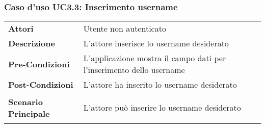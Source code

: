 \subsubsection{Caso d'uso UC3.3: Inserimento username}
\label{UC3_3}

\begin{longtable}{ l | p{11cm}}
	\hline
	\rowcolor{Gray}
	 \multicolumn{2}{c}{UC3.3: Inserimento username} \\
	 \hline
	\textbf{Attori} & Utente non autenticato \\
	\textbf{Descrizione} & L'attore inserisce lo username desiderato \\
	\textbf{Pre-Condizioni} & L'applicazione mostra il campo dati per l'inserimento dello username \\
	\textbf{Post-Condizioni} & L'attore ha inserito lo username desiderato \\
	\textbf{Scenario Principale} & \begin{enumerate*}[label=(\arabic*.),itemjoin={\newline}]
		\item L'attore può inserire lo username desiderato
	\end{enumerate*}\\
\end{longtable}